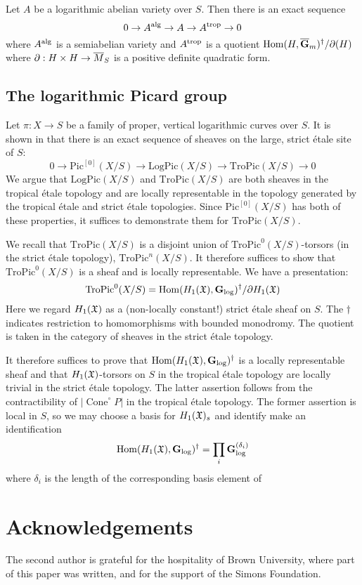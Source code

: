\documentclass[12pt]{amsart}
\theoremstyle{definition}
\theoremstyle{remark}
\def\Hom{\operatorname{Hom}}
\def\Cone{\operatorname{Cone}}
\def\logGm{\mathbf{G}_{\log}}
\def\Pic{\mathrm{Pic}}
\def\LogPic{\mathrm{LogPic}}
\def\TroPic{\mathrm{TroPic}}
\def\overnorm#1{\overline{#1}\vphantom{#1}}
\def\ologGm{\overnorm{\mathbf G}_m}
\begin{document}
Let $A$ be a logarithmic abelian variety over $S$.  Then there is an exact sequence
\begin{equation}
0 \to A^{\rm alg} \to A \to A^{\rm trop} \to 0
\end{equation}
where $A^{\rm alg}$ is a semiabelian variety and $A^{\rm trop}$ is a quotient $\Hom(H, \ologGm)^\dagger / \partial(H)$ where $\partial : H \times H \to \overnorm M_S$ is a positive definite quadratic form. 

 
\subsection{The logarithmic Picard group}

Let $\pi : X \to S$ be a family of proper, vertical logarithmic curves over $S$.  It is shown in \cite{logpic} that there is an exact sequence of sheaves on the large, strict \'etale site of $S$:
\begin{equation} 
0 \to \Pic^{[0]}(X/S) \to \LogPic(X/S) \to \TroPic(X/S) \to 0
\end{equation}
We argue that $\LogPic(X/S)$ and $\TroPic(X/S)$ are both sheaves in the tropical \'etale topology and are locally representable in the topology generated by the tropical \'etale and strict \'etale topologies.  Since $\Pic^{[0]}(X/S)$ has both of these properties, it suffices to demonstrate them for $\TroPic(X/S)$.

We recall that $\TroPic(X/S)$ is a disjoint union of $\TroPic^0(X/S)$-torsors (in the strict \'etale topology), $\TroPic^n(X/S)$.  It therefore suffices to show that $\TroPic^0(X/S)$ is a sheaf and is locally representable.  We have a presentation:
\begin{equation}
\TroPic^0(X/S) = \Hom(H_1(\frak X), \logGm)^\dagger / \partial H_1(\frak X)
\end{equation}
Here we regard $H_1(\frak X)$ as a (non-locally constant!) strict \'etale sheaf on $S$.  The $\dagger$ indicates restriction to homomorphisms with bounded monodromy.  The quotient is taken in the category of sheaves in the strict \'etale topology.

It therefore suffices to prove that $\Hom(H_1(\frak X), \logGm)^\dagger$ is a locally representable sheaf and that $H_1(\frak X)$-torsors on $S$ in the tropical \'etale topology are locally trivial in the strict \'etale topology.  The latter assertion follows from the contractibility of $|\Cone^\circ P|$ in the tropical \'etale topology.  The former assertion is local in $S$, so we may choose a basis for $H_1(\frak X)_s$ and identify make an identification
\begin{equation}
\Hom(H_1(\frak X), \logGm)^\dagger = \prod_i \logGm^{(\delta_i)}
\end{equation}
where $\delta_i$ is the length of the corresponding basis element of 



\section{Acknowledgements}

The second author is grateful for the hospitality of Brown University, where part of this paper was written, and for the support of the Simons Foundation.
\end{document}
